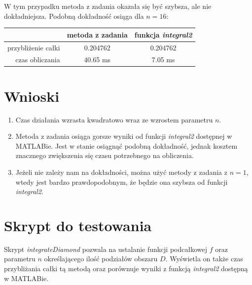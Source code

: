 \documentclass[12pt]{article}
\begin{document}
\begin{enumerate}[label=\textbf{Przykład \arabic*}]
		W tym przypadku metoda z zadania okazała się być szybsza, ale nie dokładniejsza. Podobną dokładność osiąga dla $n = 16$:
		
		\begin{table}[H]
			\centering
			\begin{tabular}{|r|c|c|}
				\hline
				                   & metoda z zadania & funkcja \textit{integral2} \\ \hline
				przybliżenie całki &     0.204762     & 0.204762                   \\ \hline
				   czas obliczania &     40.65 ms     & 7.05 ms                    \\ \hline
			\end{tabular}
		\end{table}
		
	\end{enumerate}
	
	
	
	
	
	
	\section{Wnioski}
	\begin{enumerate}
		\item Czas działania wzrasta kwadratowo wraz ze wzrostem parametru $n$.
		
		\item Metoda z zadania osiąga gorsze wyniki od funkcji \textit{integral2} dostępnej w MATLABie. Jest w stanie osiągnąć podobną dokładność, jednak kosztem znacznego zwiększenia się czasu potrzebnego na obliczenia.
		
		\item Jeżeli nie zależy nam na dokładności, można użyć metody z zadania z $n = 1$, wtedy jest bardzo prawdopodobnym, że będzie ona szybsza od funkcji \textit{integral2}.
	\end{enumerate}

	
	
	
	
	
	\section{Skrypt do testowania}
	Skrypt \textit{integrateDiamond} pozwala na ustalanie funkcji podcałkowej $f$ oraz parametru $n$ określającego ilość podziałów obszaru $D$. Wyświetla on także czas przybliżania całki tą metodą oraz porównuje wyniki z funkcją \textit{integral2} dostępną w MATLABie.
	
\end{document}

